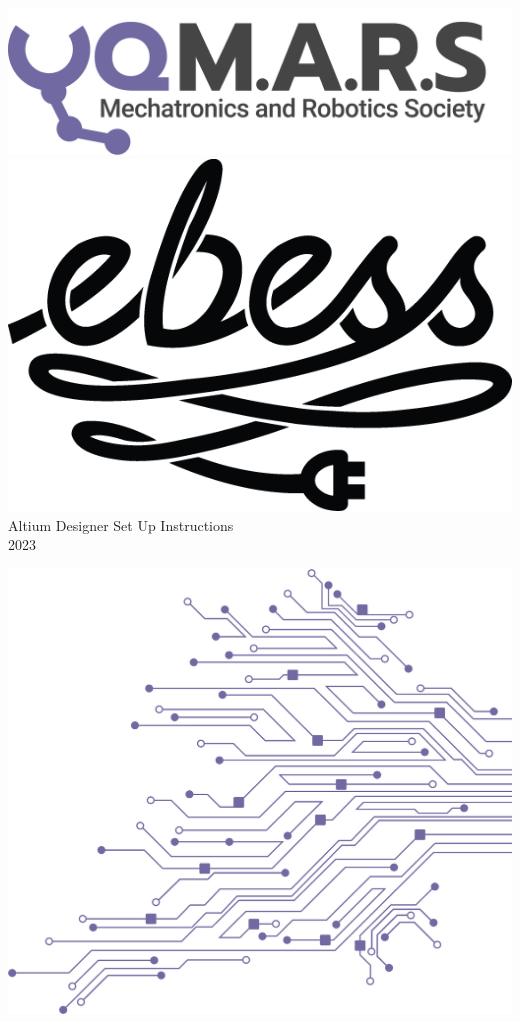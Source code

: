 \documentclass[a4paper,12pt]{report}
\begin{document}
\begin{titlepage}
    \begin{center}
        \vspace*{15mm}
        \includegraphics[width=0.4\paperwidth]{PCB/Assests/Logo (Dark).png} \\
        \vspace{1cm}
        \includegraphics[width=0.25\paperwidth]{PCB/Assests/EBESS_logo-04.png} \\
        \vspace{1cm}
        \Huge Altium Designer Set Up Instructions \\
        \huge \textcolor{turbo_purple}{2023}
    \end{center}
    \vfill
    \includegraphics[height=0.5\paperheight, right]{PCB/Assests/Pattern - PCB (Solid).png}
    \vspace*{10mm}
\end{titlepage}
\end{document}
